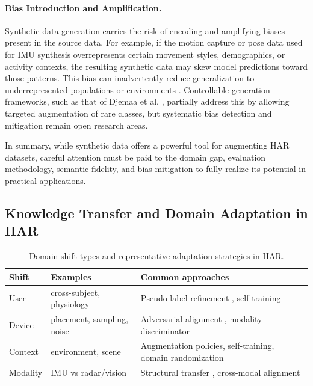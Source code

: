 \paragraph{Bias Introduction and Amplification.}
Synthetic data generation carries the risk of encoding and amplifying biases present in the source data. For example, if the motion capture or pose data used for IMU synthesis overrepresents certain movement styles, demographics, or activity contexts, the resulting synthetic data may skew model predictions toward those patterns. This bias can inadvertently reduce generalization to underrepresented populations or environments \cite{kiran2023synthetic}. Controllable generation frameworks, such as that of Djemaa et al. \cite{djemaa2024improved}, partially address this by allowing targeted augmentation of rare classes, but systematic bias detection and mitigation remain open research areas.

In summary, while synthetic data offers a powerful tool for augmenting HAR datasets, careful attention must be paid to the domain gap, evaluation methodology, semantic fidelity, and bias mitigation to fully realize its potential in practical applications.




\subsection{Knowledge Transfer and Domain Adaptation in HAR}

\begin{table}[t]
  \centering
  \footnotesize
  \caption{Domain shift types and representative adaptation strategies in HAR.}
  \label{tab:adaptation-taxonomy}
  \begin{tabular}{l p{2.1cm} p{3.6cm}}
    \toprule
    \textbf{Shift} & \textbf{Examples} & \textbf{Common approaches} \\
    \midrule
    User & cross-subject, physiology & Pseudo-label refinement \cite{fu2021personalized}, self-training \cite{thukral2025cross} \\
    Device & placement, sampling, noise & Adversarial alignment \cite{sanabria2021contrasgan}, modality discriminator \cite{wu2024class} \\
    Context & environment, scene & Augmentation policies, self-training, domain randomization \cite{chakma2023domain} \\
    Modality & IMU vs radar/vision & Structural transfer \cite{alinia2023model}, cross-modal alignment \cite{thukral2025cross} \\
    \bottomrule
  \end{tabular}
\end{table}

